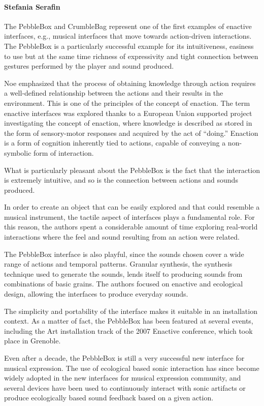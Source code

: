 \paragraph{Stefania Serafin}

The PebbleBox and CrumbleBag represent one of the first examples of enactive interfaces, e.g., musical interfaces that move towards action-driven interactions. The PebbleBox is a particularly successful example for its intuitiveness, easiness to use but at the same time richness of expressivity and tight connection between gestures performed by the player and sound produced.

Noe \cite{Noe:2004} emphasized that the process of obtaining knowledge through action requires a well-defined relationship between the actions and their results in the environment. This is one of the principles of the concept of enaction. The term enactive interfaces \cite{Essl:2006} was explored thanks to a European Union supported project investigating the concept of enaction, where knowledge is described as stored in the form of sensory-motor responses and acquired by the act of ``doing.'' Enaction is a form of cognition inherently tied to actions, capable of conveying a non-symbolic form of interaction.

What is particularly pleasant about the PebbleBox is the fact that the interaction is extremely intuitive, and so is the connection between actions and sounds produced. 

In order to create an object that can be easily explored and that could resemble a musical instrument, the tactile aspect of interfaces plays a fundamental role. For this reason, the authors spent a considerable amount of time exploring real-world interactions where the feel and sound resulting from an action were related.

The PebbleBox interface is also playful, since the sounds chosen cover a wide range of actions and temporal patterns. Granular synthesis, the synthesis technique used to generate the sounds, lends itself to producing sounds from combinations of basic grains.  The authors focused on enactive and ecological design, allowing the interfaces to produce everyday sounds.

The simplicity and portability of the interface makes it suitable in an installation context. As a matter of fact, the PebbleBox has been featured at several events, including the Art installation track of the 2007 Enactive conference, which took place in Grenoble. 

Even after a decade, the PebbleBox is still a very successful new interface for musical expression. The use of ecological based sonic interaction \cite{:2013a} has since become widely adopted in the new interfaces for musical expression community, and several devices have been used to continuously interact with sonic artifacts or produce ecologically based sound feedback based on a given action. 

